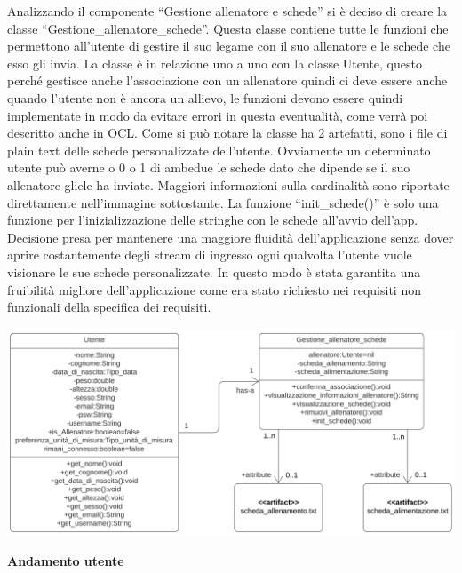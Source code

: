 \documentclass{article}
\begin{document}
      Analizzando il componente “Gestione allenatore e schede” si è deciso di creare la classe “Gestione\_allenatore\_schede”. Questa classe contiene tutte le funzioni che permettono all’utente di gestire il suo legame con il suo allenatore e le schede che esso gli invia. La classe è in relazione uno a uno con la classe Utente, questo perché gestisce anche l’associazione con un allenatore quindi ci deve essere anche quando l’utente non è ancora un allievo, le funzioni devono essere quindi implementate in modo da evitare errori in questa eventualità, come verrà poi descritto anche in OCL.
      Come si può notare la classe ha 2 artefatti, sono i file di plain text delle schede personalizzate dell’utente. Ovviamente un determinato utente può averne o 0 o 1 di ambedue le schede dato che dipende se il suo allenatore gliele ha inviate. Maggiori informazioni sulla cardinalità sono riportate direttamente nell’immagine sottostante. La funzione “init\_schede()” è solo una funzione per l’inizializzazione delle stringhe con le schede all’avvio dell’app. Decisione presa per mantenere una maggiore fluidità dell’applicazione senza dover aprire costantemente degli stream di ingresso ogni qualvolta l’utente vuole visionare le sue schede personalizzate. In questo modo è stata garantita una fruibilità migliore dell’applicazione come era stato richiesto nei requisiti non funzionali della specifica dei requisiti.\\

      \begin{center}
            \includegraphics[scale=0.5]{classi/Gestione_allenatore_schede.png}
      \end{center}

      {\large\textbf{Andamento utente}}\\
\end{document}
